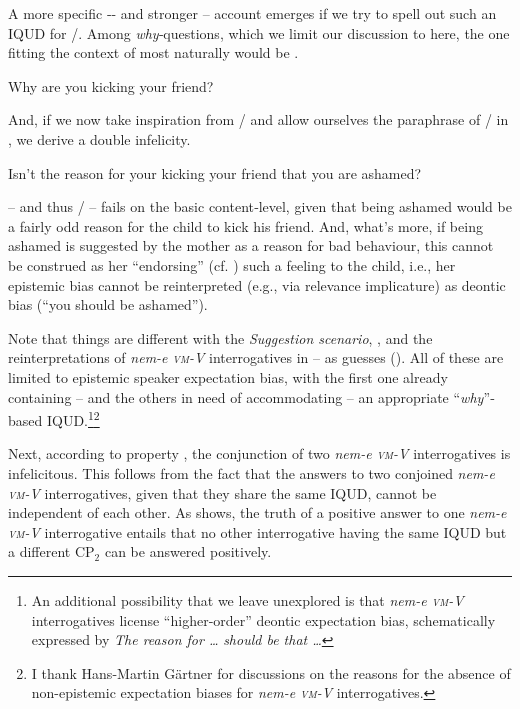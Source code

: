 \documentclass[output=paper,colorlinks,citecolor=brown]{langscibook}
\begin{document}
	A more specific ‐- and stronger -- account emerges if we try to spell out such an IQUD for /. Among \textit{why}‐questions, which we limit our
	discussion to here, the one fitting the context of  most naturally
	would be .
	
	
	\ea\label{ex:why-kicking} Why are you kicking your friend?
	\z
	
	\noindent And, if we now take inspiration from \citet{delahunty1990}/\citet{declerck1992} and allow ourselves the paraphrase of / in , we derive a double infelicity.
	
	\ea\label{ex:the-reason} Isn't the reason for your kicking your friend that you are ashamed?
	\z
	
	\noindent {} -- and thus / -- fails on the basic content‐level, given that being ashamed would be a fairly odd reason for the child to kick his
	friend. And, what's more, if being ashamed is suggested by the mother as a reason for bad behaviour, this cannot be construed as her ``endorsing'' (cf. \citealt{silk2020}) such a feeling to the child, i.e., her epistemic bias cannot be reinterpreted (e.g., via relevance implicature) as deontic bias (``you should be ashamed'').
	
	Note that things are different with the \textit{Suggestion scenario}, , and the reinterpretations of \textit{nem-e \textsc{vm}-V} interrogatives in --  as guesses (). All of these are limited to epistemic speaker expectation bias, with the first one already containing -- and the others
	in need of accommodating -- an appropriate ``\textit{why}''‐based IQUD.\footnote{An additional possibility that we leave unexplored is that \textit{nem-e \textsc{vm}-V} interrogatives license ``higher‐order'' deontic expectation bias, schematically expressed by \textit{The reason for \dots} \textit{should be that \dots}}\footnote{I thank Hans-Martin Gärtner for discussions on the reasons for the absence of non-epistemic expectation biases for \textit{nem-e \textsc{vm}-V}  interrogatives.}
	
	
	Next, according to property , the conjunction of two \textit{nem\nobreakdash-e \textsc{vm}-V} interrogatives is infelicitous. This follows from the fact that the answers to two conjoined  \textit{nem-e \textsc{vm}-V} interrogatives, given that they share the same IQUD, cannot be independent of each other. As  shows, the truth of a positive answer to one \textit{nem-e \textsc{vm}-V} interrogative entails that no other   interrogative having the same IQUD but a different CP$_2$ can be answered positively. 
\end{document}
